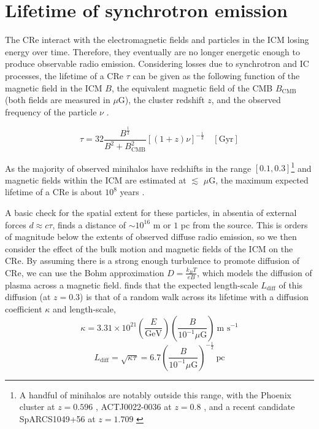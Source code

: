 \section{Lifetime of synchrotron emission}

The CRe interact with the electromagnetic fields and particles in the ICM losing energy over time. Therefore, they eventually are no longer energetic enough to produce observable radio emission. Considering losses due to synchrotron and IC processes, the lifetime of a CRe $\tau$ can be given as the following function of the magnetic field in the ICM $B$, the equivalent magnetic field of the CMB $B_{\mathrm{CMB}}$ (both fields are measured in $\mu$G), the cluster redshift $z$, and the observed frequency of the particle $\nu$ \citep{vanWeeren2019}. 

\begin{equation}
    \tau = 32 \frac{B^{\frac12}}{B^2 + B^2_{\mathrm{CMB}}}\left[(1+z)\nu\right]^{-\frac12}\quad [\text{Gyr}]
\end{equation}

As the majority of observed minihalos have redshifts in the range $[0.1, 0.3]$\footnote{A handful of minihalos are notably outside this range, with the Phoenix cluster at $z=0.596$ \citep{vanWeeren2014}, ACTJ0022-0036 at $z=0.8$ \citep{Knowles2019}, and a recent candidate SpARCS1049+56 at $z=1.709$ \citep{HLavacek2025}} and magnetic fields within the ICM are estimated at $\lesssim$ $\mu$G, the maximum expected lifetime of a CRe is about $10^{8}$ years \citep{Sarazin1999, Ferreti2012, Gitti2018}. 

A basic check for the spatial extent for these particles, in absentia of external forces $d \approx c\tau$, finds a distance of $\sim 10^{16}$ m or $1$ pc from the source. This is orders of magnitude below the extents of observed diffuse radio emission, so we then consider the effect of the bulk motion and magnetic fields of the ICM on the CRe. By assuming there is a strong enough turbulence to promote diffusion of CRe, we can use the Bohm approximation $D = \frac{k_B T}{eB}$, which models the diffusion of plasma across a magnetic field. \citet{Bagchi2002} finds that the expected length-scale $L_{\mathrm{diff}}$ of this diffusion (at $z=0.3$) is that of a random walk across its lifetime with a diffusion coefficient $\kappa$ and length-scale,
\begin{equation}
    \kappa = 3.31\times10^{21} \left(\frac E{\text{GeV}}\right)\left(\frac B{10^{-1} \mu\text{G}}\right) \>\text{m s}^{-1}
\end{equation}
\begin{equation}
    L_{\mathrm{diff}} = \sqrt{\kappa\tau} = 6.7\left(\frac B{10^{-1}\mu\text{G}}\right)^{-\frac12}\>\text{pc}
\end{equation}


